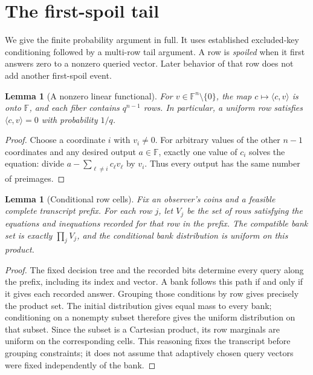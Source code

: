 \documentclass[11pt,letterpaper]{article}
\newtheorem{lemma}[theorem]{Lemma}
\theoremstyle{definition}
\newcommand{\F}{\mathbb F}
\newcommand{\dotp}[2]{\langle #1,#2\rangle}
\begin{document}
\section{The first-spoil tail}
\label{sec:tail}
We give the finite probability argument in full. It uses established excluded-key conditioning followed by a multi-row tail argument. A row is \emph{spoiled} when it first answers zero to a nonzero queried vector. Later behavior of that row does not add another first-spoil event.

\begin{lemma}[A nonzero linear functional]
For $v\in\F^n\setminus\{0\}$, the map $c\mapsto\dotp{c}{v}$ is onto $\F$, and each fiber contains $q^{n-1}$ rows. In particular, a uniform row satisfies $\dotp{c}{v}=0$ with probability $1/q$.
\end{lemma}
\begin{proof}
Choose a coordinate $i$ with $v_i\ne0$. For arbitrary values of the other $n-1$ coordinates and any desired output $a\in\F$, exactly one value of $c_i$ solves the equation: divide $a-\sum_{\ell\ne i}c_\ell v_\ell$ by $v_i$. Thus every output has the same number of preimages.
\end{proof}

\begin{lemma}[Conditional row cells]
Fix an observer's coins and a feasible complete transcript prefix. For each row $j$, let $V_j$ be the set of rows satisfying the equations and inequations recorded for that row in the prefix. The compatible bank set is exactly $\prod_j V_j$, and the conditional bank distribution is uniform on this product.
\end{lemma}
\begin{proof}
The fixed decision tree and the recorded bits determine every query along the prefix, including its index and vector. A bank follows this path if and only if it gives each recorded answer. Grouping those conditions by row gives precisely the product set. The initial distribution gives equal mass to every bank; conditioning on a nonempty subset therefore gives the uniform distribution on that subset. Since the subset is a Cartesian product, its row marginals are uniform on the corresponding cells. This reasoning fixes the transcript before grouping constraints; it does not assume that adaptively chosen query vectors were fixed independently of the bank.
\end{proof}
\end{document}
